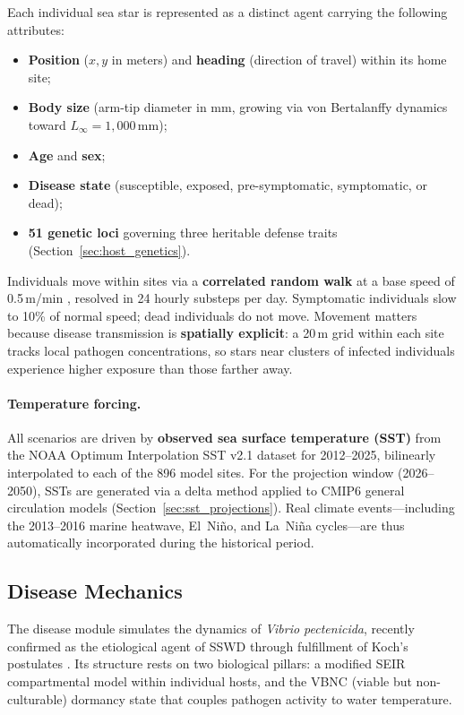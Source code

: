 Each individual sea star is represented as a distinct agent carrying the
following attributes:
\begin{itemize}
  \item \textbf{Position} ($x, y$ in meters) and \textbf{heading}
        (direction of travel) within its home site;
  \item \textbf{Body size} (arm-tip diameter in mm, growing via von
        Bertalanffy dynamics toward $L_\infty = 1{,}000$\,mm);
  \item \textbf{Age} and \textbf{sex};
  \item \textbf{Disease state} (susceptible, exposed, pre-symptomatic,
        symptomatic, or dead);
  \item \textbf{51 genetic loci} governing three heritable defense traits
        (Section~\ref{sec:host_genetics}).
\end{itemize}

Individuals move within sites via a \textbf{correlated random walk} at a
base speed of 0.5\,m/min \citep{hodin2021}, resolved in 24 hourly substeps
per day.  Symptomatic individuals slow to 10\% of normal speed; dead
individuals do not move.  Movement matters because disease transmission is
\textbf{spatially explicit}: a 20\,m grid within each site tracks local
pathogen concentrations, so stars near clusters of infected individuals
experience higher exposure than those farther away.

\paragraph{Temperature forcing.}
All scenarios are driven by \textbf{observed sea surface temperature (SST)}
from the NOAA Optimum Interpolation SST v2.1 dataset for 2012--2025,
bilinearly interpolated to each of the 896 model sites.  For the projection
window (2026--2050), SSTs are generated via a delta method applied to CMIP6
general circulation models (Section~\ref{sec:sst_projections}).  Real
climate events---including the 2013--2016 marine heatwave, El~Ni\~no, and
La~Ni\~na cycles---are thus automatically incorporated during the
historical period.

\subsection{Disease Mechanics}
\label{sec:disease}

The disease module simulates the dynamics of \textit{Vibrio pectenicida},
recently confirmed as the etiological agent of SSWD through fulfillment of
Koch's postulates \citep{prentice2025}.  Its structure rests on two
biological pillars: a modified SEIR compartmental model within individual
hosts, and the VBNC (viable but non-culturable) dormancy state that couples
pathogen activity to water temperature.

